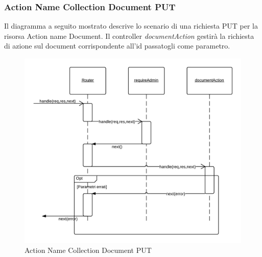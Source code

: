 \subsubsection{Action Name Collection Document PUT}
Il diagramma a seguito mostrato descrive lo scenario di una richiesta PUT per la risorsa Action name Document.
Il controller \emph{documentAction} gestirà la richiesta di azione sul document corrispondente all'id passatogli come parametro.
\begin{figure}[H]
	\begin{center} 
		\includegraphics[scale=0.20]{scenari/Action Name Collection Document PUT.png} 
		\caption{Action Name Collection Document PUT}
	\end{center} 
\end{figure}

